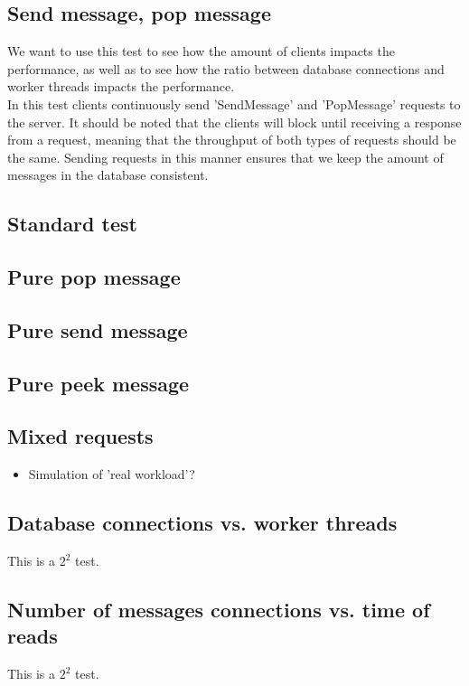 \documentclass{article}
\begin{document}
        \subsection{Send message, pop message}
            We want to use this test to see how the amount of clients impacts the performance, as well as to see how the ratio between database connections and worker threads impacts the performance.\\
            In this test clients continuously send 'SendMessage' and 'PopMessage' requests to the server. It should be noted that the clients will block until receiving a response from a request, meaning that the throughput of both types of requests should be the same. Sending requests in this manner ensures that we keep the amount of messages in the database consistent.

        \subsection{Standard test}

        \subsection{Pure pop message}
        \subsection{Pure send message}
        \subsection{Pure peek message}

        \subsection{Mixed requests}
            \begin{itemize}
                \item Simulation of 'real workload'?
            \end{itemize}

        \subsection{Database connections vs. worker threads}
            This is a $2^2$ test.

        \subsection{Number of messages connections vs. time of reads}
            This is a $2^2$ test.
\end{document}
